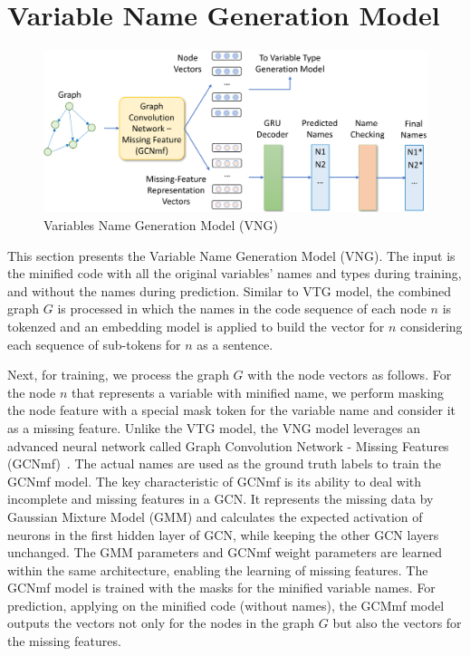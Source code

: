 \section{Variable Name Generation Model}
\label{sec:name-gen}

\begin{figure}[ht]
	\begin{center}
	  \includegraphics[width=4.7in]{figures/name-gen-model}
          \vspace{-6pt}
		\caption{Variables Name Generation Model (VNG)}
		\label{fig:name-gen}
	\end{center}
\end{figure}

This section presents the Variable Name Generation Model (VNG).  The
input is the minified code with all the original variables' names and
types during training, and without the names during
prediction. Similar to VTG model, the combined graph $G$ is processed
in which the names in the code sequence of each node $n$ is tokenzed
and an embedding model is applied to build the vector for $n$
considering each sequence of sub-tokens for $n$ as a sentence.

Next, for training, we process the graph $G$ with the node vectors as
follows. For the node $n$ that represents a variable with minified
name, we perform masking the node feature with a special mask token
for the variable name and consider it as a missing feature. Unlike the
VTG model, the VNG model leverages an advanced neural network called
Graph Convolution Network - Missing Features (GCNmf)~\cite{GCNmf}.
The actual names are used as the ground truth labels to train the
GCNmf model. The key characteristic of GCNmf is its ability to deal
with incomplete and missing features in a GCN. It represents the
missing data by Gaussian Mixture Model (GMM) and calculates the
expected activation of neurons in the first hidden layer of GCN, while
keeping the other GCN layers unchanged. The GMM parameters and GCNmf
weight parameters are learned within the same architecture, enabling
the learning of missing features. The GCNmf model is trained with the
masks for the minified variable names. For prediction, applying on the
minified code (without names), the GCMmf model outputs the vectors not
only for the nodes in the graph $G$ but also the vectors for the
missing features.


